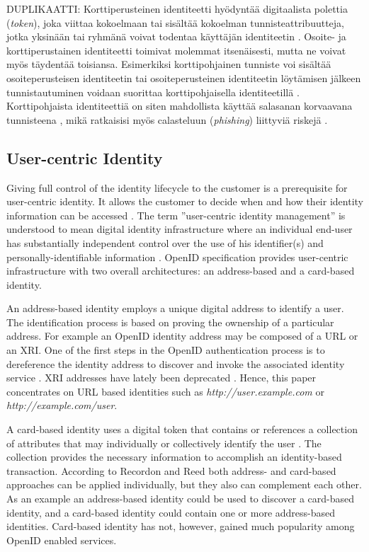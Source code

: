\documentclass[english,gradu]{tktltiki}
\begin{document}
              DUPLIKAATTI:
Korttiperusteinen identiteetti hyödyntää digitaalista polettia (\emph{token}), joka viittaa kokoelmaan tai sisältää kokoelman tunnisteattribuutteja, jotka yksinään tai ryhmänä voivat todentaa käyttäjän identiteetin \cite{openid_2.0_platform_2009}. Osoite- ja korttiperustainen identiteetti toimivat molemmat itsenäisesti, mutta ne voivat myös täydentää toisiansa. Esimerkiksi korttipohjainen tunniste voi sisältää osoiteperusteisen identiteetin tai osoiteperusteinen identiteetin löytämisen jälkeen tunnistautuminen voidaan suorittaa korttipohjaisella identiteetillä \cite{openid_2.0_platform_2009}. Korttipohjaista identiteettiä on siten mahdollista käyttää salasanan korvaavana tunnisteena \cite{infocards_09}, mikä ratkaisisi myös calasteluun (\emph{phishing}) liittyviä riskejä \cite{cameron_infocard_07}.


\subsection{User-centric Identity}

Giving full control of the identity lifecycle to the customer is a prerequisite for user-centric identity. It allows the customer to decide when and how their identity information can be accessed \cite{open_identity_management_saas_2009}. The term ''user-centric identity management'' is understood to mean digital identity infrastructure where an individual end-user has substantially independent control over the use of his identifier(s) and personally-identifiable information \cite{openid_2.0_platform_2009}. OpenID specification provides user-centric infrastructure with two overall architectures: an address-based and a card-based identity.

An address-based identity employs a unique digital address to identify a user. The identification process is based on proving the ownership of a particular address. For example an OpenID identity address may be composed of a URL or an XRI. One of the first steps in the OpenID authentication process is to dereference the identity address to discover and invoke the associated identity service \cite{openid_2.0_platform_2009}. XRI addresses have lately been deprecated \cite{xri_depcrecated_08a, xri_depcrecated_08b, xri_depcrecated_08c, xri_depcrecated_08d}. Hence, this paper concentrates on URL based identities such as \emph{http://user.example.com} or \emph{http://example.com/user}.

A card-based identity uses a digital token that contains or references a collection of attributes that may individually or collectively identify the user \cite{openid_2.0_platform_2009}. The collection provides the necessary information to accomplish an identity-based transaction. According to Recordon and Reed \cite{openid_2.0_platform_2009} both address- and card-based approaches can be applied individually, but they also can complement each other. As an example an address-based identity could be used to discover a card-based identity, and a card-based identity could contain one or more address-based identities. Card-based identity has not, however, gained much popularity among OpenID enabled services.
\end{document}
